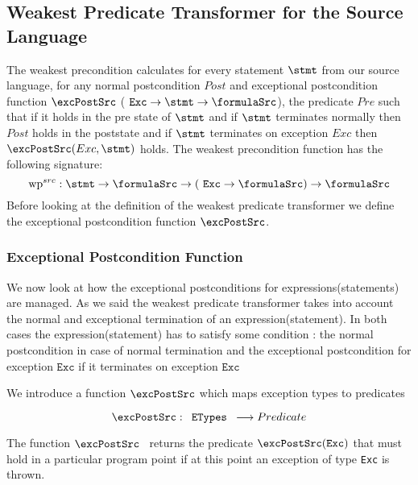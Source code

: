 
\subsection{Weakest Predicate Transformer for the Source Language } \label{pog:wpSrc}

The weakest precondition calculates for every statement $\stmt$ from our source language,
for any normal postcondition $Post$ and exceptional postcondition function $\excPostSrc$ ($ \mbox{ \rm \texttt{Exc}} \rightarrow \stmt \rightarrow \formulaSrc $),
 the predicate $Pre$ such that if it holds in the pre state of $\stmt$ and   if $\stmt$ terminates normally then $Post$ holds in the poststate and
 if $\stmt$ terminates on exception $Exc$ then $\excPostSrc(Exc, \stmt)$ holds.
The weakest precondition function has the following signature:
$$ \textrm{wp}^{src} : \stmt \rightarrow \formulaSrc \rightarrow ( \mbox{ \rm \texttt{Exc}} \rightarrow  \formulaSrc ) \rightarrow \formulaSrc$$
Before looking at the definition of the weakest predicate transformer we define the exceptional postcondition function $\excPostSrc$.


\subsubsection{Exceptional Postcondition Function}


We now look at how the exceptional postconditions for expressions(statements) are managed. 
As we said the weakest predicate transformer takes into account the normal and exceptional termination of 
an expression(statement). 
In both cases the expression(statement) has to satisfy some condition : 
the normal postcondition in case of normal termination and the exceptional postcondition
for exception $\texttt{Exc}$ if it terminates on exception $\texttt{Exc}$


We introduce a function $\excPostSrc$  which maps exception types to predicates  

$$ \excPostSrc :  \mbox{\rm \texttt{ ETypes  }}  \longrightarrow   Predicate $$ 



The function $\excPostSrc$ \ returns the predicate $\excPostSrc (\texttt{Exc}) $ that must hold in a particular program point if
 at this point an exception of type \texttt{Exc} is thrown.





